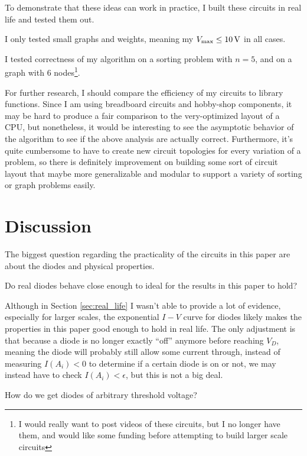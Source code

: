 \documentclass{article}
\begin{document}
To demonstrate that these ideas can work in practice, I built these circuits
in real life and tested them out.

I only tested small graphs and weights, meaning my $V_\text{max} \leq \SI{10}{\volt}$ in all cases.

I tested correctness of my algorithm on a sorting problem with $n=5$, and on a graph with $6$ nodes\footnote{I would really want to post videos of these circuits, but I no longer have them, and would like some funding before attempting to build larger scale circuits}.

For further research, I should compare the efficiency of my circuits to library functions.
Since I am using breadboard circuits and hobby-shop components, it may be hard to produce a fair comparison to the very-optimized layout of a CPU, but nonetheless, it would be interesting to see the asymptotic behavior of the algorithm to see if the above analysis are actually correct.
Furthermore, it's quite cumbersome to have to create new circuit topologies for every variation of a problem, so there is definitely improvement on building some sort of circuit layout that maybe more generalizable and modular to support a variety of sorting or graph problems easily.

\section{Discussion}

The biggest question regarding the practicality of the circuits in this paper are about the diodes and physical properties.

\begin{question}
  Do real diodes behave close enough to ideal for the results in this paper to hold?
\end{question}

Although in Section \ref{sec:real_life} I wasn't able to provide a lot of evidence, especially for larger scales, the exponential $I-V$ curve for diodes likely makes the properties in this paper good enough to hold in real life.
The only adjustment is that because a diode is no longer exactly ``off'' anymore before reaching $V_D$, meaning the diode will probably still allow some current through, instead of measuring $I(A_i) < 0$ to determine if a certain diode is on or not, we may instead have to check $I(A_i) < \epsilon$, but this is not a big deal.

\begin{question}
  How do we get diodes of arbitrary threshold voltage?
\end{question}
\end{document}
